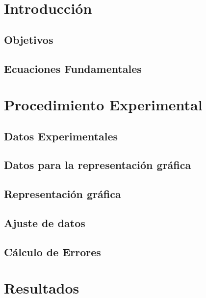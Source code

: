 \documentclass[a4paper,12pt]{article}
\begin{document}
\title{}
\author{Gabriel D'Andrade Furlanetto}
\maketitle

\pagebreak 
\section{Introducción}

\subsection{Objetivos}

\subsection{Ecuaciones Fundamentales}

\section{Procedimiento Experimental}

\subsection{Datos Experimentales}

\subsection{Datos para la representación gráfica}

\subsection{Representación gráfica}

\subsection{Ajuste de datos}

\subsection{Cálculo de Errores}

\section{Resultados}
\end{document}
